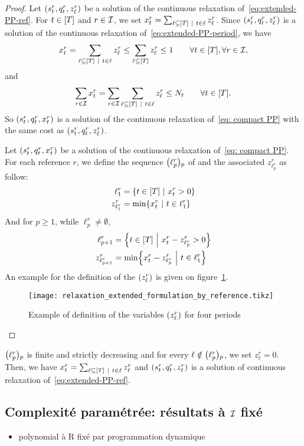 \begin{proof}
Let $\bracket{\inventory_t^r, \quantity_t^r, z_{\ell}^r}$ be a solution of the continuous relaxation of~\eqref{eq:extended-PP-ref}.
For $t\in\range{\horizon}$ and $r\in\mathcal{I}$, we set $\setup_t^r=\sum_{\ell\subseteq\range{\horizon}~|~t\in\ell} z_{\ell}^r$.
Since $\bracket{\inventory_t^r, \quantity_t^r, z_{\ell}^r}$ is a solution of the continuous relaxation of~\eqref{eq:extended-PP-period}, we have
$$
\setup_t^r
= \sum_{\ell\subseteq\range{\horizon}~|~t\in\ell} z_{\ell}^r
\le \sum_{\ell\subseteq\range{\horizon}} z_{\ell}^r
\le 1
\qquad \forall t\in\range{\horizon},\forall r\in\REF,
$$
and
$$
\sum_{r\in\REF}\setup_t^r
= \sum_{r\in\REF}\sum_{\ell\subseteq\range{\horizon}~|~t\in\ell} z_{\ell}^r
\le \nbsetups_t
\qquad \forall t\in\range{\horizon}.
$$
So $\bracket{\inventory_t^r, \quantity_t^r, \setup_t^r}$  is a solution of the continuous relaxation of~\eqref{eq: compact PP} with the same cost as $\bracket{\inventory_t^r, \quantity_t^r, z_{\ell}^r}$.


Let $\bracket{\inventory_t^r, \quantity_t^r, \setup_t^r}$ be a solution of the continuous relaxation of~\eqref{eq: compact PP}. For each reference $r$, we define the sequence $\bracket{\ell_p^r}_p$ of and the associated $z_{\ell_p^r}^r$ as follow:
$$
\begin{aligned}
\ell_1^r       &= \crbracket{t\in\range{\horizon}~|~\setup_t^r>0} \\
z_{\ell_1^r}^r &= \min\crbracket{\setup_t^r~|~t\in\ell_1^r}
\end{aligned}
$$
And for $p\ge1$, while $\ell_p^r\ne\emptyset$,
$$
\begin{aligned}
\ell_{p+1}^r       &= \crbracket{t\in\range{\horizon}~\Big|~\setup_t^r-z_{\ell_p^r}^r>0} \\
z_{\ell_{p+1}^r}^r &= \min\crbracket{\setup_t^r-z_{\ell_p^r}^r~\Big|~t\in\ell_1^r}
\end{aligned}
$$
An example for the definition of the $\bracket{z_{\ell}^r}$ is given on figure~\ref{fig:relaxation-extended-formulation-by-reference}.
\begin{figure}[h]
  \centering
  \texttt{[image: relaxation\_extended\_formulation\_by\_reference.tikz]}
  \caption{Example of definition of the variables $\bracket{z_{\ell}^r}$ for four periods}
  \label{fig:relaxation-extended-formulation-by-reference}
\end{figure}
\end{proof}

$\bracket{\ell_p^r}_p$ is finite and strictly decreasing and for every $\ell\notin\bracket{\ell_p^r}_p$, we set $z_{\ell}^r=0$. Then, we have $\setup_t^r = \sum_{\ell\subseteq\range{\horizon}~|~t\in\ell} z_{\ell}^r$ and $\bracket{\inventory_t^r, \quantity_t^r, z_{\ell}^r}$ is a solution of continuous relaxation of~\eqref{eq:extended-PP-ref}.



\subsection{Complexité paramétrée: résultats à $\mathcal{I}$ fixé}


\begin{itemize}
  \item polynomial à R fixé par programmation dynamique
\end{itemize}
